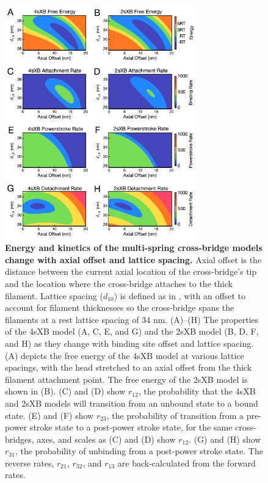\documentclass[10pt]{article}
\newcommand{\citet}[1]{\cite{#1}}
\begin{document}
\clearpage
\begin{figure}[ht]
    \begin{center}
    \includegraphics[width=3.25in]{../imgs/Figure2.pdf}
    \caption{ \textbf{Energy and kinetics of the multi-spring cross-bridge models change with axial offset and lattice spacing.} 
        Axial offset is the distance between the current axial location of the cross-bridge's tip and the location where the cross-bridge attaches to the thick filament.  
        Lattice spacing ($d_{10}$) is defined as in \protect\citet{Millman1998}, with an offset to account for filament thicknesses so the cross-bridge spans the filaments at a rest lattice spacing of 34 nm. 
        (A)--(H)  The properties of the 4sXB model (A, C, E, and G) and the 2sXB model (B, D, F, and H) as they change with binding site offset and lattice spacing.
        (A) depicts the free energy of the 4sXB model at various lattice spacings, with the head stretched to an axial offset from the thick filament attachment point.
        The free energy of the 2sXB model is shown in (B).  
        (C) and (D) show $r_{12}$, the probability that the 4sXB and 2sXB models will transition from an unbound state to a bound state. 
        (E) and (F) show $r_{23}$, the probability of transition from a pre-power stroke state to a post-power stroke state, for the same cross-bridges, axes, and scales as (C) and (D) show $r_{12}$.
        (G) and (H) show $r_{31}$, the probability of unbinding from a post-power stroke state. 
        The reverse rates, $r_{21}$, $r_{32}$, and $r_{13}$ are back-calculated from the forward rates.
        \label{fig_kinetics_contours}
        }
    \end{center}
\end{figure}
\end{document}
